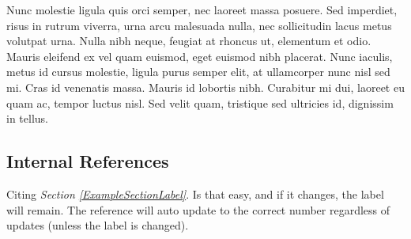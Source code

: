 \documentclass{article}
\begin{document}
\pagebreak
Nunc molestie ligula quis orci semper, nec laoreet massa posuere. Sed imperdiet, risus in rutrum viverra, urna arcu malesuada nulla, nec sollicitudin lacus metus volutpat urna. Nulla nibh neque, feugiat at rhoncus ut, elementum et odio. Mauris eleifend ex vel quam euismod, eget euismod nibh placerat. Nunc iaculis, metus id cursus molestie, ligula purus semper elit, at ullamcorper nunc nisl sed mi. Cras id venenatis massa. Mauris id lobortis nibh. Curabitur mi dui, laoreet eu quam ac, tempor luctus nisl. Sed velit quam, tristique sed ultricies id, dignissim in tellus. 

\subsection{Internal References}
Citing \textit{Section \ref{ExampleSectionLabel}}. Is that easy, and if it changes, the label will remain. The reference will auto update to the correct number regardless of updates (unless the label is changed).




\end{document}
